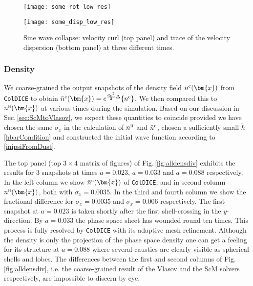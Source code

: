 \documentclass[twocolumn, nofootinbib, showpacs, superscriptaddress]{revtex4-1}
\renewcommand{\H}[0]{{\textsc{h}}}
\newcommand{\sigx}{{\sigma_{\! x}}}
\newcommand{\thbar}{\tilde\hbar}
\renewcommand{\c}[0]{{\rm{c}}}
\newcommand{\vx}[0]{\bm{x} }
\begin{document}
\begin{center}
\begin{figure*}[!]
\texttt{[image: some\_rot\_low\_res]}

\vspace{-0.27cm}

\texttt{[image: some\_disp\_low\_res]}
\caption{Sine wave collapse: velocity curl (top panel)  and trace of the velocity dispersion (bottom panel) at three different times.}
\label{fig:allrotdisp}
\end{figure*}
\end{center}

\vspace{-1.2cm}
\subsubsection{Density}
\label{sec:numericsSineDensity}
We coarse-grained the output snapshots of the density field $n^\c(\vx)$ from \texttt{ColDICE} to obtain $\bar n^\c(\vx) = e^{\frac{\sigx^2}{2} \Delta} \{ n^\c \}$.
We then compared this to $n^\H(\vx)$ at various times during the simulation.
Based on our discussion in Sec.\,\eqref{sec:ScMtoVlasov}, we expect these quantities to coincide provided 
we have chosen the same $\sigx$ in the calculation of $n^\H$ and $\bar n^\c$, chosen a sufficiently small $\thbar$ \eqref{hbarCondition} and 
constructed the initial wave function according to \eqref{inipsiFromDust}.

The top panel (top $3\times 4$ matrix of figures) of Fig.\,\ref{fig:alldensdiv} exhibits 
the results for 3 snapshots at times $a=0.023$, $a=0.033$ and $a=0.088$ respectively.
In the left column we show $\bar n^\c(\vx)$ of \texttt{ColDICE}, and in second column $n^\H(\vx)$, both with $\sigx=0.0035$. 
In the third and fourth column we show the fractional difference for $\sigx=0.0035$ and $\sigx=0.006$ respectively.
The first snapshot at $a=0.023$ is taken shortly after the first shell-crossing in the $y$-direction.
By $a=0.033$ the phase space sheet has wounded round ten times.
This process is fully resolved by \texttt{ColDICE} with its adaptive mesh refinement. 
 Although the density is only the projection of the phase space density one can get a feeling for its structure at $a=0.088$ 
where several caustics are clearly visible as spherical shells and lobes.
The differences between  the first and second columns of  Fig.\,\ref{fig:alldensdiv}, 
i.e. the coarse-grained result of the Vlasov and the ScM solvers respectively,  are impossible to discern by eye.
\end{document}
